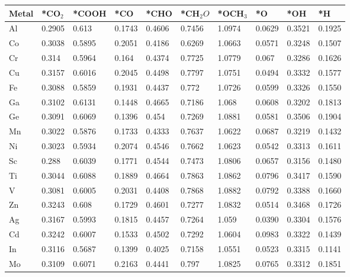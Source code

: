 \begin{table}[h]
  \centering
  {\fontsize{6}{12}\selectfont
  \begin{tabular}{*{10}{l}}
    \hline
    Metal & *CO$_2$ & *COOH & *CO & *CHO   & *CH$_2O$ & *OCH$_3$ & *O & *OH    & *H     \\
    \hline
    Al & 0.2905 & 0.613  & 0.1743 & 0.4606 & 0.7456 & 1.0974 & 0.0629 & 0.3521 & 0.1925 \\
    Co & 0.3038 & 0.5895 & 0.2051 & 0.4186 & 0.6269 & 1.0663 & 0.0571 & 0.3248 & 0.1507 \\
    Cr & 0.314  & 0.5964 & 0.164  & 0.4374 & 0.7725 & 1.0779 & 0.067  & 0.3286 & 0.1626 \\
    Cu & 0.3157 & 0.6016 & 0.2045 & 0.4498 & 0.7797 & 1.0751 & 0.0494 & 0.3332 & 0.1577 \\
    Fe & 0.3088 & 0.5859 & 0.1931 & 0.4437 & 0.772  & 1.0726 & 0.0599 & 0.3326 & 0.1550 \\
    Ga & 0.3102 & 0.6131 & 0.1448 & 0.4665 & 0.7186 & 1.068  & 0.0608 & 0.3202 & 0.1813 \\
    Ge & 0.3091 & 0.6069 & 0.1396 & 0.454  & 0.7269 & 1.0881 & 0.0581 & 0.3506 & 0.1904 \\
    Mn & 0.3022 & 0.5876 & 0.1733 & 0.4333 & 0.7637 & 1.0622 & 0.0687 & 0.3219 & 0.1432 \\
    Ni & 0.3023 & 0.5934 & 0.2074 & 0.4546 & 0.7662 & 1.0623 & 0.0542 & 0.3313 & 0.1611 \\
    Sc & 0.288  & 0.6039 & 0.1771 & 0.4544 & 0.7473 & 1.0806 & 0.0657 & 0.3156 & 0.1480 \\
    Ti & 0.3044 & 0.6088 & 0.1889 & 0.4664 & 0.7863 & 1.0862 & 0.0796 & 0.3417 & 0.1590 \\
    V  & 0.3081 & 0.6005 & 0.2031 & 0.4408 & 0.7868 & 1.0882 & 0.0792 & 0.3388 & 0.1660 \\
    Zn & 0.3243 & 0.608  & 0.1729 & 0.4601 & 0.7277 & 1.0832 & 0.0514 & 0.3468 & 0.1726 \\
    Ag & 0.3167 & 0.5993 & 0.1815 & 0.4457 & 0.7264 & 1.059  & 0.0390 & 0.3304 & 0.1576 \\
    Cd & 0.3242 & 0.6007 & 0.1533 & 0.4502 & 0.7292 & 1.0604 & 0.0983 & 0.3322 & 0.1439 \\
    In & 0.3116 & 0.5687 & 0.1399 & 0.4025 & 0.7158 & 1.0551 & 0.0523 & 0.3315 & 0.1141 \\
    Mo & 0.3109 & 0.6071 & 0.2163 & 0.4441 & 0.797  & 1.0825 & 0.0765 & 0.3312 & 0.1851 \\

\end{tabular}}
\end{table}
